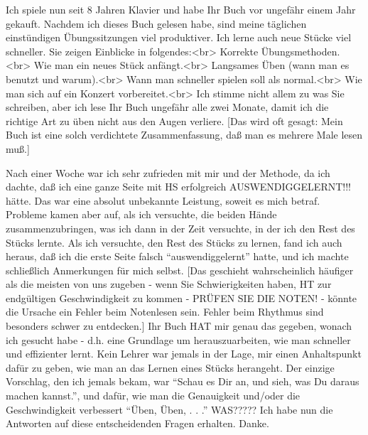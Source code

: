 \item \label{testimonials15}
Ich spiele nun seit 8 Jahren Klavier und habe Ihr Buch vor ungefähr einem Jahr gekauft.
Nachdem ich dieses Buch gelesen habe, sind meine täglichen einstündigen Übungssitzungen viel produktiver.
Ich lerne auch neue Stücke viel schneller.
Sie zeigen Einblicke in folgendes:<br>
Korrekte Übungsmethoden.<br>
Wie man ein neues Stück anfängt.<br>
Langsames Üben (wann man es benutzt und warum).<br>
Wann man schneller spielen soll als normal.<br>
Wie man sich auf ein Konzert vorbereitet.<br>
Ich stimme nicht allem zu was Sie schreiben, aber ich lese Ihr Buch ungefähr alle zwei Monate, damit ich die richtige Art zu üben nicht aus den Augen verliere.
[Das wird oft gesagt: Mein Buch ist eine solch verdichtete Zusammenfassung, daß man es mehrere Male lesen muß.]


\item \label{testimonials16}
Nach einer Woche war ich sehr zufrieden mit mir und der Methode, da ich dachte, daß ich eine ganze Seite mit HS erfolgreich AUSWENDIGGELERNT!!! hätte.
Das war eine absolut unbekannte Leistung, soweit es mich betraf.
Probleme kamen aber auf, als ich versuchte, die beiden Hände zusammenzubringen, was ich dann in der Zeit versuchte, in der ich den Rest des Stücks lernte.
Als ich versuchte, den Rest des Stücks zu lernen, fand ich auch heraus, daß ich die erste Seite falsch \enquote{auswendiggelernt} hatte, und ich machte schließlich Anmerkungen für mich selbst.
[Das geschieht wahrscheinlich häufiger als die meisten von uns zugeben - wenn Sie Schwierigkeiten haben, HT zur endgültigen Geschwindigkeit zu kommen - PRÜFEN SIE DIE NOTEN! - könnte die Ursache ein Fehler beim Notenlesen sein.
Fehler beim Rhythmus sind besonders schwer zu entdecken.]
Ihr Buch HAT mir genau das gegeben, wonach ich gesucht habe - d.h. eine Grundlage um herauszuarbeiten, wie man schneller und effizienter lernt.
Kein Lehrer war jemals in der Lage, mir einen Anhaltspunkt dafür zu geben, wie man an das Lernen eines Stücks herangeht.
Der einzige Vorschlag, den ich jemals bekam, war \enquote{Schau es Dir an, und sieh, was Du daraus machen kannst.}, und dafür, wie man die Genauigkeit und/oder die Geschwindigkeit verbessert \enquote{Üben, Üben, . . .} WAS?????
Ich habe nun die Antworten auf diese entscheidenden Fragen erhalten. Danke.


